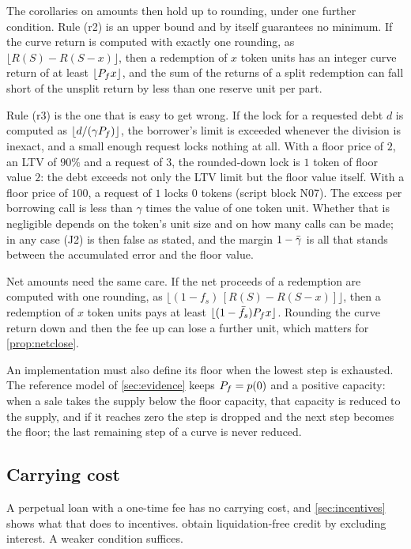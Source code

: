 The corollaries on amounts then hold up to rounding, under one further condition. Rule (r2) is an upper bound and by itself guarantees no minimum. If the curve return is computed with exactly one rounding, as $\lfloor R(S)-R(S-x)\rfloor$, then a redemption of $x$ token units has an integer curve return of at least $\lfloor P_f x\rfloor$, and the sum of the returns of a split redemption can fall short of the unsplit return by less than one reserve unit per part.

Rule (r3) is the one that is easy to get wrong. If the lock for a requested debt $d$ is computed as $\lfloor d/(\gamma P_f)\rfloor$, the borrower's limit is exceeded whenever the division is inexact, and a small enough request locks nothing at all. With a floor price of $2$, an LTV of $90\%$ and a request of $3$, the rounded-down lock is $1$ token of floor value $2$: the debt exceeds not only the LTV limit but the floor value itself. With a floor price of $100$, a request of $1$ locks $0$ tokens (script block N07). The excess per borrowing call is less than $\gamma$ times the value of one token unit. Whether that is negligible depends on the token's unit size and on how many calls can be made; in any case (J2) is then false as stated, and the margin $1-\bar\gamma$ is all that stands between the accumulated error and the floor value.

Net amounts need the same care. If the net proceeds of a redemption are computed with one rounding, as $\lfloor(1-f_s)\,[R(S)-R(S-x)]\rfloor$, then a redemption of $x$ token units pays at least $\lfloor(1-\bar f_s)P_f x\rfloor$. Rounding the curve return down and then the fee up can lose a further unit, which matters for \cref{prop:netclose}.

An implementation must also define its floor when the lowest step is exhausted. The reference model of \cref{sec:evidence} keeps $P_f=p(0)$ and a positive capacity: when a sale takes the supply below the floor capacity, that capacity is reduced to the supply, and if it reaches zero the step is dropped and the next step becomes the floor; the last remaining step of a curve is never reduced.

\subsection{Carrying cost}\label{sec:carry}

A perpetual loan with a one-time fee has no carrying cost, and \cref{sec:incentives} shows what that does to incentives.  obtain liquidation-free credit by excluding interest. A weaker condition suffices.

